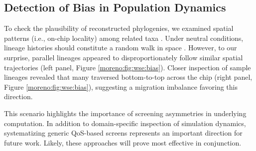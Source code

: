 \vspace{-4.0ex}
\subsection{Detection of Bias in Population Dynamics}
\label{moreno:sec:case2:bias}
\vspace{-2.0ex}

To check the plausibility of reconstructed phylogenies, we examined spatial patterns (i.e., on-chip locality) among related taxa \cite{novembre2008genes,grundler2025geographic}.
Under neutral conditions, lineage histories should constitute a random walk in space \cite{lemey2010phylogeography}.
However, to our surprise, parallel lineages appeared to disproportionately follow similar spatial trajectories (left panel, Figure \ref{moreno:fig:wse:bias}).
Closer inspection of sample lineages revealed that many traversed bottom-to-top across the chip (right panel, Figure \ref{moreno:fig:wse:bias}), suggesting a migration imbalance favoring this direction.

This scenario highlights the importance of screening asymmetries in underlying computation.
In addition to domain-specific inspection of simulation dynamics, systematizing generic QoS-based screens represents an important direction for future work.
Likely, these approaches will prove most effective in conjunction.

